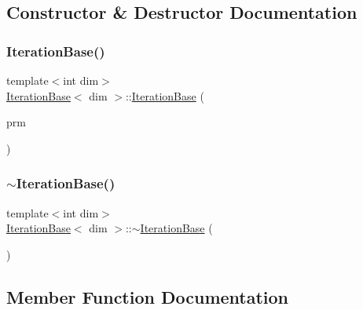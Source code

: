 \subsection{Constructor \& Destructor Documentation}
\mbox{\label{class_iteration_base_a385009434fcdf512953f317088e09b0b}} 
\subsubsection{\texorpdfstring{Iteration\+Base()}{IterationBase()}}
{\footnotesize\ttfamily template$<$int dim$>$ \\
\hyperlink{class_iteration_base}{Iteration\+Base}$<$ dim $>$\+::\hyperlink{class_iteration_base}{Iteration\+Base} (\begin{DoxyParamCaption}\item[{const Parameter\+Handler \&}]{prm }\end{DoxyParamCaption})}

\mbox{\label{class_iteration_base_a942860f3a03d46da883c1c6c430bea55}} 
\subsubsection{\texorpdfstring{$\sim$\+Iteration\+Base()}{~IterationBase()}}
{\footnotesize\ttfamily template$<$int dim$>$ \\
\hyperlink{class_iteration_base}{Iteration\+Base}$<$ dim $>$\+::$\sim$\hyperlink{class_iteration_base}{Iteration\+Base} (\begin{DoxyParamCaption}{ }\end{DoxyParamCaption})\hspace{0.3cm}{\ttfamily [virtual]}}



\subsection{Member Function Documentation}
\mbox{\label{class_iteration_base_a8bcba214850c5d47f5ae38fb98f51a44}} 
